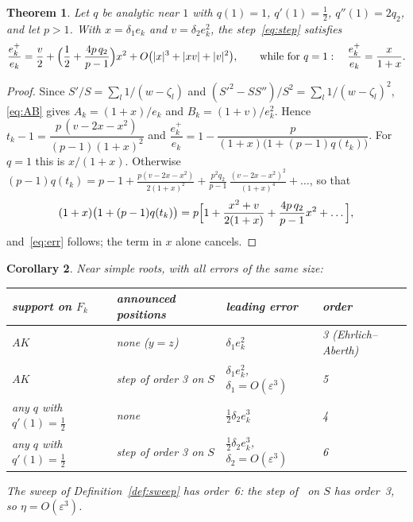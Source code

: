 \documentclass[10pt,a4paper]{article}
\newtheorem{theorem}{Theorem}[section]
\newtheorem{corollary}[theorem]{Corollary}
\theoremstyle{definition}
\numberwithin{equation}{section}
\begin{document}
\begin{theorem}\label{thm:order}
Let $q$ be analytic near $1$ with $q(1)=1$, $q'(1)=\frac12$, $q''(1)=2q_2$, and let $p>1$. With
$x=\delta_1e_k$ and $v=\delta_2e_k^2$, the step~\eqref{eq:step} satisfies
\begin{equation}\label{eq:err}
 \frac{e_k^+}{e_k}=\frac v2+\Bigl(\frac12+\frac{4p\,q_2}{p-1}\Bigr)x^2+O\bigl(|x|^3+|xv|+|v|^2\bigr),
 \qquad\text{while for }q=1:\quad \frac{e_k^+}{e_k}=\frac{x}{1+x}.
\end{equation}
\end{theorem}
\begin{proof}
Since $S'/S=\sum_l1/(w-\zeta_l)$ and $(S'^2-SS'')/S^2=\sum_l1/(w-\zeta_l)^2$, \eqref{eq:AB} gives
$A_k=(1+x)/e_k$ and $B_k=(1+v)/e_k^2$. Hence
$t_k-1=\dfrac{p\,(v-2x-x^2)}{(p-1)(1+x)^2}$ and
$\dfrac{e_k^+}{e_k}=1-\dfrac{p}{(1+x)\bigl(1+(p-1)q(t_k)\bigr)}$. For $q=1$ this is $x/(1+x)$. Otherwise
$(p-1)q(t_k)=p-1+\frac{p(v-2x-x^2)}{2(1+x)^2}+\frac{p^2q_2}{p-1}\,\frac{(v-2x-x^2)^2}{(1+x)^4}+\dots$,
so that
\[
 (1+x)\bigl(1+(p-1)q(t_k)\bigr)=p\Bigl[1+\frac{x^2+v}{2(1+x)}+\frac{4p\,q_2}{p-1}x^2+\dots\Bigr],
\]
and~\eqref{eq:err} follows; the term in $x$ alone cancels.
\end{proof}

\begin{corollary}\label{cor:orders}
Near simple roots, with all errors of the same size:
\begin{center}\small
\begin{tabular}{llll}
\toprule
support on $F_k$ & announced positions & leading error & order\\
\midrule
$AK$ & none ($y=z$) & $\delta_1e_k^2$ & 3 (Ehrlich--Aberth)\\
$AK$ & step of order 3 on $S$ & $\delta_1e_k^2$, $\delta_1=O(\varepsilon^3)$ & 5\\
any $q$ with $q'(1)=\frac12$ & none & $\frac12\delta_2e_k^3$ & 4\\
any $q$ with $q'(1)=\frac12$ & step of order 3 on $S$ & $\frac12\delta_2e_k^3$, $\delta_2=O(\varepsilon^3)$ & 6\\
\bottomrule
\end{tabular}
\end{center}
The sweep of Definition~\ref{def:sweep} has order~6: the step of~\cite{g2} on $S$ has order~3, so
$\eta=O(\varepsilon^3)$.
\end{corollary}
\end{document}
